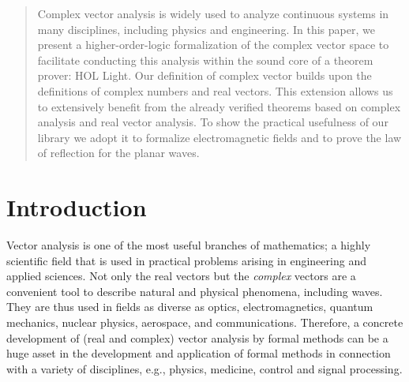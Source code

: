 \documentclass{llncs}
\begin{document}
  \begin{abstract}
Complex vector analysis is widely used to analyze continuous systems in many disciplines, including physics and engineering. In this paper, we present a
higher-order-logic formalization of the complex vector space to facilitate conducting this analysis within the sound core of a 
theorem prover: HOL Light. Our definition of complex vector builds upon the
definitions of complex numbers and real vectors. This extension allows us to extensively benefit from the already verified theorems based on complex analysis
and real vector analysis. To show the practical usefulness of our library 
we adopt it to formalize electromagnetic fields and to prove the law of reflection for the planar waves. 



  
  \end{abstract}

  \section{Introduction} \label{sec:intro}
 
 Vector analysis is one of the most useful branches of mathematics; a highly scientific field that is used in practical problems arising in engineering and applied sciences. 
Not only the real vectors but the \emph{complex} vectors are a convenient tool to describe natural and physical phenomena, including waves. They are thus used in fields as diverse as optics, electromagnetics, quantum mechanics, nuclear physics, aerospace, and communications. 
Therefore, a concrete development of (real and complex) vector analysis by formal methods can be a huge asset in the development and application of formal methods in connection with a variety of disciplines, e.g., physics, medicine, control and signal processing. 

  
  
\end{document}
